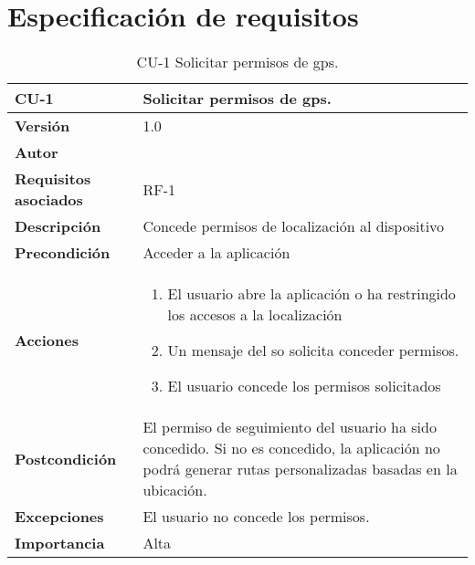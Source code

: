 \section{Especificación de requisitos}


\begin{table}[p]
	\centering
	\begin{tabularx}{\linewidth}{ p{} p{} }
		\toprule
		\textbf{CU-1}    & \textbf{Solicitar permisos de \acrshort{gps}.}\\
		\toprule
		\textbf{Versión}              & 1.0    \\
		\textbf{Autor}                & \autor \\
		\textbf{Requisitos asociados} & RF-1 \\
		\textbf{Descripción}          & Concede permisos de localización al dispositivo \\
		\textbf{Precondición}         & Acceder a la aplicación \\
		\textbf{Acciones}             &
		\begin{enumerate}
			\def\labelenumi{\arabic{enumi}.}
			\tightlist
			\item El usuario abre la aplicación o ha restringido los accesos a la localización
			\item Un mensaje del \acrfull{so} solicita conceder permisos.
			\item El usuario concede los permisos solicitados
		\end{enumerate}\\
		\textbf{Postcondición}        & El permiso de seguimiento del usuario ha sido concedido. Si no es concedido, la aplicación no podrá generar rutas personalizadas basadas en la ubicación. \\
		\textbf{Excepciones}          & El usuario no concede los permisos. \\
		\textbf{Importancia}          & Alta  \\
		\bottomrule
	\end{tabularx}
	\caption{CU-1 Solicitar permisos de \acrshort{gps}.}
\end{table}

